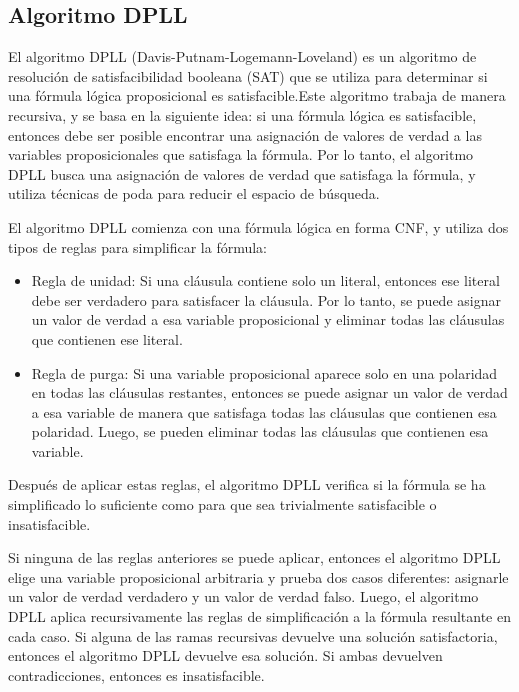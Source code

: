 \documentclass{article}
\begin{document}
    \subsection*{Algoritmo DPLL}
        El algoritmo DPLL (Davis-Putnam-Logemann-Loveland) es un algoritmo de resolución de satisfacibilidad booleana (SAT) que se utiliza 
        para determinar si una fórmula lógica proposicional es satisfacible.Este algoritmo trabaja de manera recursiva, y se basa en 
        la siguiente idea: si una fórmula lógica es satisfacible, 
        entonces debe ser posible encontrar una asignación de valores de verdad a las variables proposicionales que satisfaga la fórmula. 
        Por lo tanto, el algoritmo DPLL busca una asignación de valores de verdad que satisfaga la fórmula, y utiliza técnicas de poda para 
        reducir el espacio de búsqueda.
            
        El algoritmo DPLL comienza con una fórmula lógica en forma CNF, y utiliza dos tipos de reglas para simplificar la fórmula:
            
        \begin{itemize}
            \item Regla de unidad: Si una cláusula contiene solo un literal, entonces ese literal debe ser verdadero para 
            satisfacer la cláusula. Por lo tanto, se puede asignar un valor de verdad a esa variable proposicional y eliminar 
            todas las cláusulas que contienen ese literal.

            \item Regla de purga: Si una variable proposicional aparece solo en una polaridad en todas las cláusulas restantes, 
            entonces se puede asignar un valor de verdad a esa variable de manera que satisfaga todas las cláusulas que contienen 
            esa polaridad. Luego, se pueden eliminar todas las cláusulas que contienen esa variable.
        \end{itemize}

        Después de aplicar estas reglas, el algoritmo DPLL verifica si la fórmula se ha simplificado lo suficiente como para que sea 
        trivialmente satisfacible o insatisfacible.  

        Si ninguna de las reglas anteriores se puede aplicar, entonces el algoritmo DPLL elige una variable proposicional 
        arbitraria y prueba dos casos diferentes: asignarle un valor de verdad verdadero y un valor de verdad falso.
        Luego, el algoritmo DPLL aplica recursivamente las reglas de simplificación a la fórmula resultante en cada caso. 
        Si alguna de las ramas recursivas devuelve una solución satisfactoria, entonces el algoritmo DPLL devuelve esa solución.
        Si ambas devuelven contradicciones, entonces es insatisfacible.
\end{document}
